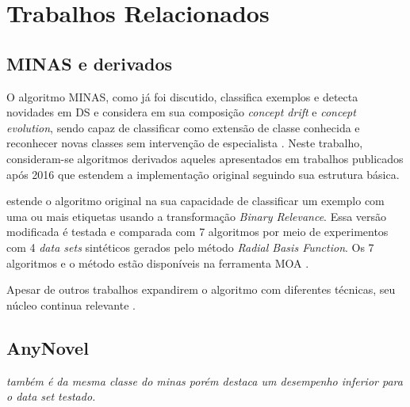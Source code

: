 \chapter{Trabalhos Relacionados}
\label{cha:related}



\section{MINAS e derivados}

O algoritmo MINAS, como já foi discutido, classifica exemplos e detecta
novidades em DS e considera em sua composição \emph{concept drift} e
\emph{concept evolution}, sendo capaz de classificar como extensão de classe
conhecida e reconhecer novas classes sem intervenção de especialista
\cite{Faria2016minas}. Neste trabalho, consideram-se algoritmos derivados
aqueles apresentados em trabalhos publicados após 2016 que estendem a
implementação original seguindo sua estrutura básica.


 estende o algoritmo original na sua capacidade de
classificar um exemplo com uma ou mais etiquetas usando a transformação
\emph{Binary Relevance}. Essa versão modificada é testada e comparada com 7
algoritmos por meio de experimentos com 4 \emph{data sets} sintéticos gerados
pelo método \emph{Radial Basis Function}. Os 7 algoritmos e o método estão
disponíveis na ferramenta MOA \cite{MOA}.


Apesar de outros trabalhos expandirem o algoritmo com diferentes técnicas, seu
núcleo continua relevante \cite{DaSilva2018,DaSilva2018thesis,Costa2019}.

\section{AnyNovel}

\textit{também é da mesma classe do minas porém  destaca um
desempenho inferior para o \emph{data set} testado.}

